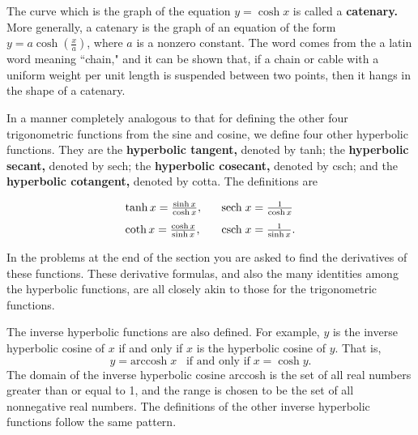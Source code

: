 The curve which is the graph of the equation $y = \cosh x$ is called a \textbf{catenary.} More generally, a catenary is the graph of an equation of the form $y = a \cosh (\frac{x}{a})$, where $a$ is a nonzero constant. The word comes from the a latin word meaning ``chain," and it can be shown that, if a chain or cable with a uniform weight per unit length is suspended between two points, then it hangs in the shape of a catenary.

In a manner completely analogous to that for defining the other four trigonometric functions from the sine and cosine, we define four other hyperbolic functions. They are the \textbf{hyperbolic tangent,} denoted by tanh; the \textbf{hyperbolic secant,} denoted by sech; the \textbf{hyperbolic cosecant,} denoted by csch; and the \textbf{hyperbolic cotangent,} denoted by cotta. The definitions are

\begin{equation}
       \begin{array}{ll}
              \tanh x = \frac{\sinh x}{\cosh x},  \;\;\; & \mbox{sech}\; x = \frac{1}{\cosh x} \vspace{.1in} \\
              \coth x = \frac{\cosh x}{\sinh x},  \;\;\; & \mbox{csch}\; x = \frac{1}{\sinh x} .
       \end{array}
       \label{eq11.6.5}
\end{equation}

\noindent In the problems at the end of the section you are asked to find the derivatives of these functions. These derivative formulas, and also the many identities among the hyperbolic functions, are all closely akin to those for the trigonometric functions.

The inverse hyperbolic functions are also defined. For example, $y$ is the inverse hyperbolic cosine of $x$ if and only if $x$ is the hyperbolic cosine of $y$. That is,
$$
       y = \mbox{arccosh}\; x \;\;\;\mbox{if and only if}\; x = \cosh y.
$$
The domain of the inverse hyperbolic cosine arccosh is the set of all real numbers greater than or equal to 1, and the range is chosen to be the set of all nonnegative real numbers. The definitions of the other inverse hyperbolic functions follow the same pattern.
